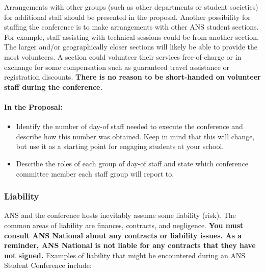 \documentclass[12pt]{article}
\begin{document}
Arrangements with other groups (such as other departments or student societies) for additional staff should be presented in the proposal. Another possibility for staffing the conference is to make arrangements with other ANS student sections. For example, staff assisting with technical sessions could  be from another section. The larger and/or geographically closer sections will likely be able to provide the most volunteers. A section could volunteer their services free-of-charge or in exchange for some compensation such as guaranteed travel assistance or registration discounts. \textbf{There is no reason to be short-handed on volunteer staff during the conference.}

\paragraph{In the Proposal:}
\begin{itemize}
\item{Identify the number of day-of staff needed to execute the conference and describe how this number was obtained. Keep in mind that this will change, but use it as a starting point for engaging students at your school.}
\item{Describe the roles of each group of day-of staff and state which conference committee member each staff group will report to.}
\end{itemize}

\subsubsection{Liability}\label{sec:liability}
ANS and the conference hosts inevitably assume some liability (risk). The common areas of liability are finances, contracts, and negligence. \textbf{You must consult ANS National about any contracts or liability issues. As a reminder, ANS National is not liable for any contracts that they have not signed.} Examples of liability that might be encountered during an ANS Student Conference include:
\end{document}
